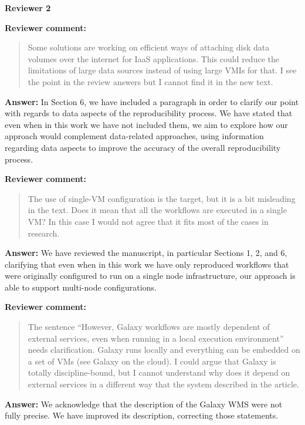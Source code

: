 \documentclass{letter}
\newenvironment{review}%
{\textbf{Reviewer comment:}\begin{quote}}%
{\end{quote}}%
\newcommand{\answer}[1]{%
      \textbf{Answer:} #1}
\newcommand{\revised}[1]{\emph{#1}\color{black}}
\begin{document}
\begin{letter}{}







\newpage

%
%
\textbf{Reviewer 2}


\begin{review}
Some solutions are working on efficient ways of attaching disk data volumes over the internet for IaaS applications. This could reduce the limitations of large data sources instead of using large VMIs for that. I see the point in the review answers but I cannot find it in the new text.
\end{review}

\answer{In Section 6, we have included a paragraph in order to clarify our point with regards to data aspects of the reproducibility process. We have stated that even when in this work we have not included them, we aim to explore how our approach would complement data-related approaches, using information regarding data aspects to improve the  accuracy of the overall reproducibility process.}

\begin{review}
The use of single-VM configuration is the target, but it is a bit misleading in the text. Does it mean that all the workflows are executed in a single VM? In this case I would not agree that it fits most of the cases in research.
\end{review}

\answer{We have reviewed the manuscript, in particular Sections 1, 2, and 6, clarifying that even when in this work we have only reproduced workflows that were originally configured to run on a single node infrastructure, our approach is able to support multi-node configurations.}

\begin{review}
The sentence ``However, Galaxy workflows are mostly dependent of external services, even when running in a local execution environment'' needs clarification. Galaxy runs locally and everything can be embedded on a set of VMs (see Galaxy on the cloud). I could argue that Galaxy is totally discipline-bound, but I cannot understand why does it depend on external services in a different way that the system described in the article.
\end{review}

\answer{We acknowledge that the description of the Galaxy WMS were not fully precise. We have improved its description, correcting those statements.}

\revised{}




\end{letter}
\end{document}

